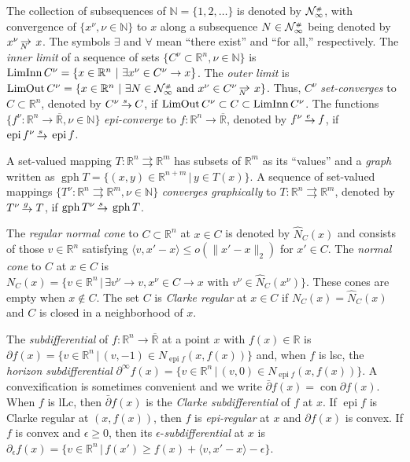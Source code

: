 \documentclass[smallextended,envcountsect]{svjour3}
\newcommand{\epi}[1]{\operatorname{epi}#1}
\newcommand{\tto}{\rightrightarrows}
\newcommand{\nats}{\mathbb{N}}
\newcommand{\reals}{\mathbb{R}}
\newcommand{\Reals}{\overline{\mathbb{R}}}
\newcommand{\nInnLim}{\mathop{\rm LimInn}\nolimits}
\newcommand{\nOutLim}{\mathop{\rm Lim\hspace{-0.01cm}Out}\nolimits}
\newcommand{\cN}{{\cal N}}
\newcommand{\grill}{{\scriptscriptstyle\#}}
\DeclareMathOperator{\con}{con}
\DeclareMathOperator{\gph}{gph}
\newcommand{\sto}{\,{\lower 1pt\hbox{$\rightarrow$}}\kern -10pt
     \hbox{\raise 4pt \hbox{$\, \scriptstyle s$}}\hskip7pt}
\newcommand{\eto}{\,{\lower 1pt\hbox{$\rightarrow$}}\kern -10pt
     \hbox{\raise 4pt \hbox{$\, \scriptstyle e$}}\hskip7pt}
\newcommand{\gto}{\,{\lower 1pt\hbox{$\rightarrow$}}\kern -10pt
     \hbox{\raise 4.5pt \hbox{$\, \scriptstyle g$}}\hskip7pt}
\def\Nto{\,{\raise 1pt\hbox{$\rightarrow$}}\kern -12pt
     \hbox{\lower 3pt \hbox{$\, \scriptstyle N$}}\hskip7pt}
\begin{document}
The collection of subsequences of $\nats=\{1, 2, \dots\}$ is denoted by  $\cN_\infty^\grill$, with convergence of $\{x^\nu, \nu\in\nats\}$ to $x$ along a subsequence $N\in \cN_\infty^\grill$ being denoted by $x^\nu \Nto x$. The symbols $\exists$ and $\forall$ mean ``there exist'' and ``for all,'' respectively. The {\em inner limit} of a sequence of sets $\{C^\nu\subset\reals^n, \nu\in\nats\}$ is $\nInnLim C^\nu = \{x\in \reals^n~|~\exists x^\nu \in C^\nu \to x\}$. The {\em outer limit} is $\nOutLim C^\nu = \{x\in \reals^n~|~\exists N\in \cN_\infty^\grill \mbox{ and } x^\nu \in C^\nu \Nto x\}$. Thus, $C^\nu$ {\em set-converges} to $C\subset\reals^n$, denoted by $C^\nu \sto C$, if $\nOutLim C^\nu \subset C \subset \nInnLim C^\nu$. The functions $\{f^\nu:\reals^n\to \Reals, \nu\in\nats\}$ {\em epi-converge} to $f:\reals^n\to \Reals$, denoted by $f^\nu \eto f$, if $\epi f^\nu \sto \epi f$. 

A set-valued mapping $T:\reals^n\tto \reals^m$ has subsets of $\reals^m$ as its ``values'' and a {\em graph} written as $\gph T = \{(x,y)\in \reals^{n+m}\,|\,y\in T(x)\}$. A sequence of set-valued mappings $\{T^\nu:\reals^n\tto \reals^m, \nu\in\nats\}$ {\em converges graphically} to $T:\reals^n\tto\reals^m$, denoted by $T^\nu \gto T$, if $\gph T^\nu \sto \gph T$. 

The {\em regular normal cone} to $C\subset\reals^n$ at $x\in C$ is denoted by $\widehat N_C(x)$ and consists of those $v\in \reals^n$ satisfying $\langle v, x'-x\rangle \leq o(\|x'-x\|_2)$ for $x'\in C$. The {\em normal cone} to $C$ at $x\in C$ is $N_C(x) = \{v\in\reals^n\,|\,\exists v^\nu\to v, x^\nu\in C\to x \text{ with } v^\nu\in \widehat N_C(x^\nu)\}$. These cones are empty when $x\not\in C$. The set $C$ is {\em Clarke regular} at $x\in C$ if $N_C(x) = \widehat N_C(x)$ and $C$ is closed in a neighborhood of $x$. 

The {\em subdifferential} of $f:\reals^n\to \Reals$ at a point $x$ with $f(x)\in\reals$ is $\partial f(x) = \{v\in\reals^n\,|\,(v,-1)\in N_{\epi f}(x,f(x))\}$ and, when $f$ is lsc, the {\em horizon subdifferential} $\partial^\infty f(x) = \{v\in\reals^n\,|\,(v,0)\in N_{\epi f}(x,f(x))\}$. A convexification is sometimes convenient and we write $\bar\partial f(x) = \con \partial f(x)$. When $f$ is lLc, then $\bar\partial f(x)$ is the {\em Clarke subdifferential} of $f$ at $x$. If $\epi f$ is Clarke regular at $(x,f(x))$, then $f$ is {\em epi-regular} at $x$ and $\partial f(x)$ is convex. If $f$ is convex and $\epsilon\geq 0$, then its $\epsilon$-{\em subdifferential} at $x$ is  $\partial_\epsilon f(x) = \{v\in\reals^n\,|\,f(x') \geq f(x) + \langle v, x'-x\rangle -\epsilon\}$.
\end{document}
